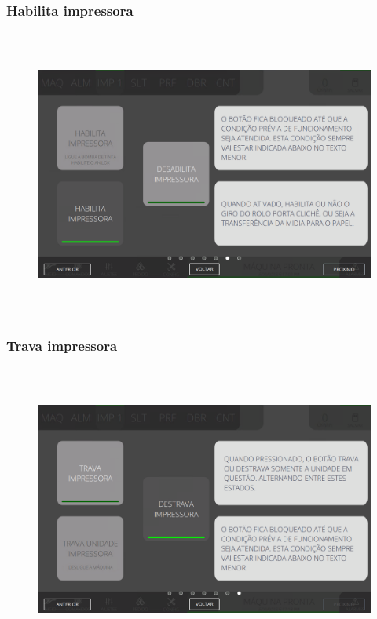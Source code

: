 \newpage
\thispagestyle{fancy}
\vspace*{40 pt}
\subsubsection{\small{Habilita impressora}} \label{miniTelaComandoImpressoraHabilitaImpressora}
\vspace*{\fill}
\begin{figure}[h]
  \centering
  \includegraphics[width=576px,height=360px]{src/imagesMiniline/04-Printer/commands/e6.png}
\end{figure}
\vspace*{\fill}

\newpage
\thispagestyle{fancy}
\vspace*{40 pt}
\subsubsection{\small{Trava impressora}} \label{miniTelaComandoImpressoraTravaImpressora}
\vspace*{\fill}
\begin{figure}[h]
  \centering
  \includegraphics[width=576px,height=360px]{src/imagesMiniline/04-Printer/commands/e7.png}
\end{figure}
\vspace*{\fill}
